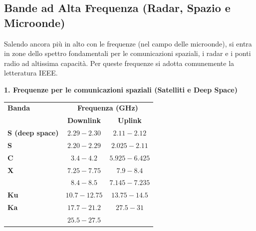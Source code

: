 \documentclass[openany,a4paper,12pt]{book}
\begin{document}
\subsection*{Bande ad Alta Frequenza (Radar, Spazio e Microonde)}

Salendo ancora più in alto con le frequenze (nel campo delle microonde), si entra in zone dello spettro fondamentali per le comunicazioni spaziali, i radar e i ponti radio ad altissima capacità. Per queste frequenze si adotta comunemente la letteratura IEEE.

\vspace{0.3cm}

\textbf{1. Frequenze per le comunicazioni spaziali (Satelliti e Deep Space)}
\begin{table}[H]
    \centering
    \small
    \renewcommand{\arraystretch}{1.2}
    \begin{tabular}{lcc}
        \toprule
        \rowcolor{PoliBlue!10}
        \textbf{Banda} & \multicolumn{2}{c}{\textbf{Frequenza (GHz)}} \\
        \rowcolor{PoliBlue!10}
        & \textbf{Downlink} & \textbf{Uplink} \\
        \midrule
        \textbf{S (deep space)} & $2.29 - 2.30$ & $2.11 - 2.12$ \\
        \textbf{S} & $2.20 - 2.29$ & $2.025 - 2.11$ \\
        \textbf{C} & $3.4 - 4.2$ & $5.925 - 6.425$ \\
        \textbf{X} & $7.25 - 7.75$ & $7.9 - 8.4$ \\
                   & $8.4 - 8.5$ & $7.145 - 7.235$ \\
        \textbf{Ku} & $10.7 - 12.75$ & $13.75 - 14.5$ \\
        \textbf{Ka} & $17.7 - 21.2$ & $27.5 - 31$ \\
                    & $25.5 - 27.5$ & \\
        \bottomrule
    \end{tabular}
\end{table}

\vspace{0.3cm}
\end{document}
